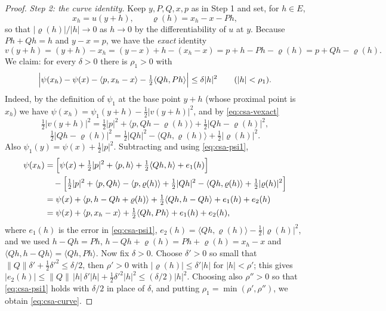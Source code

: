 \begin{proof}
\emph{Step 2: the curve identity.}
Keep $y,P,Q,x,p$ as in Step 1 and set, for $h\in E$,
\[
  x_h=u(y+h),\qquad \varrho(h)=x_h-x-Ph,
\]
so that $|\varrho(h)|/|h|\to0$ as $h\to0$ by the differentiability of $u$ at
$y$. Because $Ph+Qh=h$ and $y-x=p$, we have the \emph{exact} identity
\begin{equation}\label{eq:csa-vexact}
  v(y+h)=(y+h)-x_h=(y-x)+h-(x_h-x)=p+h-Ph-\varrho(h)=p+Qh-\varrho(h).
\end{equation}
We claim: for every $\delta>0$ there is $\rho_1>0$ with
\begin{equation}\label{eq:csa-curve}
  \Bigl|\psi(x_h)-\psi(x)-\langle p,x_h-x\rangle-\tfrac12\langle Qh,Ph\rangle\Bigr|
   \le\delta|h|^2\qquad(|h|<\rho_1).
\end{equation}
Indeed, by the definition of $\psi_1$ at the base point $y+h$ (whose proximal
point is $x_h$) we have $\psi(x_h)=\psi_1(y+h)-\tfrac12|v(y+h)|^2$, and by
\eqref{eq:csa-vexact}
\[
  \tfrac12|v(y+h)|^2
   =\tfrac12|p|^2+\langle p,Qh-\varrho(h)\rangle+\tfrac12|Qh-\varrho(h)|^2,
\]
\[
  \tfrac12|Qh-\varrho(h)|^2
   =\tfrac12|Qh|^2-\langle Qh,\varrho(h)\rangle+\tfrac12|\varrho(h)|^2 .
\]
Also $\psi_1(y)=\psi(x)+\tfrac12|p|^2$. Subtracting and using
\eqref{eq:csa-psi1},
\[
\begin{aligned}
  \psi(x_h)&=\Bigl[\psi(x)+\tfrac12|p|^2+\langle p,h\rangle
     +\tfrac12\langle Qh,h\rangle+e_1(h)\Bigr]\\
   &\quad-\Bigl[\tfrac12|p|^2+\langle p,Qh\rangle-\langle p,\varrho(h)\rangle
     +\tfrac12|Qh|^2-\langle Qh,\varrho(h)\rangle+\tfrac12|\varrho(h)|^2\Bigr]\\
   &=\psi(x)+\langle p,h-Qh+\varrho(h)\rangle
     +\tfrac12\langle Qh,h-Qh\rangle+e_1(h)+e_2(h)\\
   &=\psi(x)+\langle p,x_h-x\rangle+\tfrac12\langle Qh,Ph\rangle+e_1(h)+e_2(h),
\end{aligned}
\]
where $e_1(h)$ is the error in \eqref{eq:csa-psi1},
$e_2(h)=\langle Qh,\varrho(h)\rangle-\tfrac12|\varrho(h)|^2$, and we used
$h-Qh=Ph$, $h-Qh+\varrho(h)=Ph+\varrho(h)=x_h-x$ and
$\langle Qh,h-Qh\rangle=\langle Qh,Ph\rangle$. Now fix $\delta>0$. Choose
$\delta'>0$ so small that $\|Q\|\delta'+\tfrac12\delta'^2\le\delta/2$, then
$\rho'>0$ with $|\varrho(h)|\le\delta'|h|$ for $|h|<\rho'$; this gives
$|e_2(h)|\le\|Q\|\,|h|\,\delta'|h|+\tfrac12\delta'^2|h|^2\le(\delta/2)|h|^2$.
Choosing also $\rho''>0$ so that \eqref{eq:csa-psi1} holds with $\delta/2$ in
place of $\delta$, and putting $\rho_1=\min(\rho',\rho'')$, we obtain
\eqref{eq:csa-curve}.


\end{proof}
